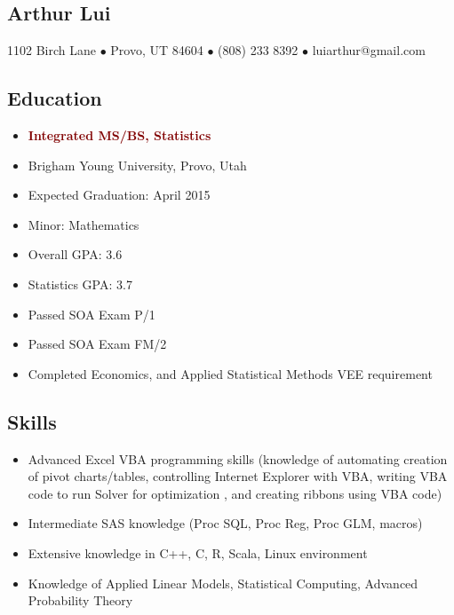 \documentclass{article}
\def\ln{\hrulefill}               %
\begin{document}
  \begin{center}
    \section*{Arthur Lui}
    1102 Birch Lane $\bullet$ Provo, UT 84604 
    $\bullet$ (808) 233 8392 $\bullet$ luiarthur@gmail.com 
  \end{center}
  \ln
  \subsection*{Education}
     \begin{itemize}
       \itemsep0em %
       \item \textcolor{Maroon}{\textbf{Integrated MS/BS, Statistics}}
       \item Brigham Young University, Provo, Utah
       \item Expected Graduation: April 2015
       \item Minor: Mathematics
       \item Overall GPA: 3.6
       \item Statistics GPA: 3.7
       \item Passed SOA Exam P/1
       \item Passed SOA Exam FM/2
       \item Completed Economics, and Applied Statistical Methods VEE requirement
     \end{itemize}

  \subsection*{Skills}
    \begin{itemize}
      \itemsep0em %
      \item  Advanced Excel VBA programming skills (knowledge of automating creation 
             of pivot charts/tables, controlling Internet Explorer with VBA, 
             writing VBA code to run Solver for optimization , and creating ribbons 
             using VBA code)
      \item  Intermediate SAS knowledge (Proc SQL, Proc Reg, Proc GLM, macros)
      \item  Extensive knowledge in C++, C, R, Scala, Linux environment
      \item  Knowledge of Applied Linear Models, Statistical Computing, 
             Advanced Probability Theory
    \end{itemize}
\end{document}
